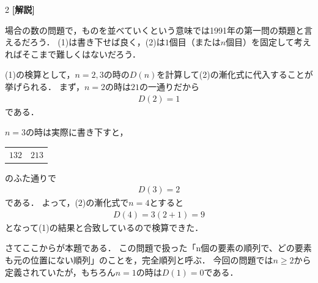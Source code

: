 \documentclass[../../main.tex]{subfiles}
\begin{document}
\begin{multicols}{2}
  \vspace{10pt}
  {\bf[解説]}

  場合の数の問題で，ものを並べていくという意味では1991年の第一問の類題と言えるだろう．
  (1)は書き下せば良く，(2)は$1$個目（または$n$個目）を固定して考えればそこまで難しくはないだろう．

  (1)の検算として，$n=2,3$の時の$D(n)$を計算して(2)の漸化式に代入することが挙げられる．
  まず，$n=2$の時は$21$の一通りだから
  \begin{align*}
    D(2) = 1
  \end{align*}
  である．

  $n=3$の時は実際に書き下すと，
  \begin{table}[H]
    \centering
    \begin{tabular}{cc}
      $132$ & $213$
    \end{tabular}
  \end{table}
  のふた通りで
  \begin{align*}
    D(3) = 2
  \end{align*}
  である．
  よって，(2)の漸化式で$n=4$とすると
  \begin{align*}
    D(4) = 3\left(2+1\right) = 9
  \end{align*}
  となって(1)の結果と合致しているので検算できた．

  \vspace{5pt}
  さてここからが本題である．
  この問題で扱った「n個の要素の順列で、どの要素も元の位置にない順列」のことを，完全順列と呼ぶ．
  今回の問題では$n\ge 2$から定義されていたが，もちろん$n=1$の時は$D(1)=0$である．


\end{multicols}
\end{document}

